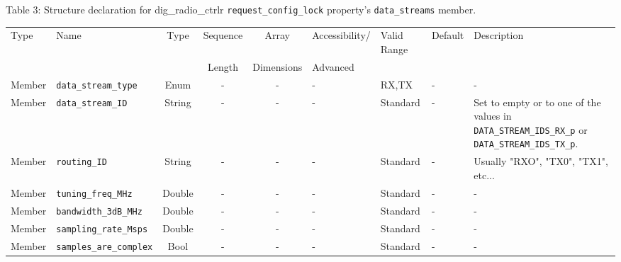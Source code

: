 \documentclass{article}
\def\comp{dig\_radio\_ctrlr}
\begin{document}
\begin{landscape}
	\noindent Table \hypertarget{tab3}{3}: Structure declaration for \comp{} \verb+request_config_lock+ property's \verb+data_streams+ member. \\
	\begin{scriptsize}
		\noindent\begin{longtable}{|p{1.8cm}|p{3.6cm}|c|c|c|p{2cm}|p{1.7cm}|p{1.0cm}|p{7.37cm}|}
			\hline
			\rowcolor{blue}
			Type         & Name                                & Type & Sequence & Array      & Accessibility/ & Valid Range  & Default & Description                                                                                                                                                                                                                 \\
			\rowcolor{blue}
			             &                                     &      & Length   & Dimensions & Advanced       &              &         &                                                                                                                                                                                                                             \\
			\hline
			Member       & \verb+data_stream_type+             & Enum  & -       & -          & -              & RX,TX        & -       & - \\
			\hline
			Member       & \verb+data_stream_ID+               & String& -       & -          & -              & Standard     & -       & Set to empty or to one of the values in \verb+DATA_STREAM_IDS_RX_p+ or \verb+DATA_STREAM_IDS_TX_p+. \\
			\hline
			Member       & \verb+routing_ID+                   & String& -       & -          & -              & Standard     & -       & Usually "RXO", "TX0", "TX1", etc... \\
			\hline
			Member       & \verb+tuning_freq_MHz+              & Double & -       & -          & -              & Standard     & -       & - \\
			\hline
			Member       & \verb+bandwidth_3dB_MHz+              & Double & -       & -          & -              & Standard     & -       & - \\
			\hline
			Member       & \verb+sampling_rate_Msps+             & Double & -       & -          & -              & Standard     & -       & - \\
			\hline
			Member       & \verb+samples_are_complex+            & Bool   & -       & -          & -              & Standard     & -       & - \\

\end{longtable}
\end{scriptsize}
\end{landscape}
\end{document}

